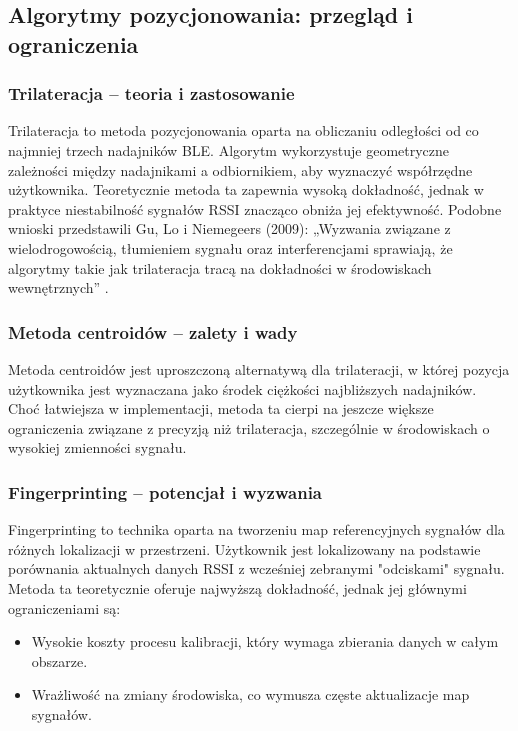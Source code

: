 \subsection{Algorytmy pozycjonowania: przegląd i ograniczenia}

\subsubsection{Trilateracja – teoria i zastosowanie}
Trilateracja to metoda pozycjonowania oparta na obliczaniu odległości od co najmniej trzech nadajników BLE. Algorytm wykorzystuje geometryczne zależności między nadajnikami a odbiornikiem, aby wyznaczyć współrzędne użytkownika. Teoretycznie metoda ta zapewnia wysoką dokładność, jednak w praktyce niestabilność sygnałów RSSI znacząco obniża jej efektywność. Podobne wnioski przedstawili Gu, Lo i Niemegeers (2009): „Wyzwania związane z wielodrogowością, tłumieniem sygnału oraz interferencjami sprawiają, że algorytmy takie jak trilateracja tracą na dokładności w środowiskach wewnętrznych” \cite{Gu2009}.

\subsubsection{Metoda centroidów – zalety i wady}
Metoda centroidów jest uproszczoną alternatywą dla trilateracji, w której pozycja użytkownika jest wyznaczana jako środek ciężkości najbliższych nadajników. Choć łatwiejsza w implementacji, metoda ta cierpi na jeszcze większe ograniczenia związane z precyzją niż trilateracja, szczególnie w środowiskach o wysokiej zmienności sygnału.

\subsubsection{Fingerprinting – potencjał i wyzwania}
Fingerprinting to technika oparta na tworzeniu map referencyjnych sygnałów dla różnych lokalizacji w przestrzeni. Użytkownik jest lokalizowany na podstawie porównania aktualnych danych RSSI z wcześniej zebranymi "odciskami" sygnału. Metoda ta teoretycznie oferuje najwyższą dokładność, jednak jej głównymi ograniczeniami są:
\begin{itemize}
    \item Wysokie koszty procesu kalibracji, który wymaga zbierania danych w całym obszarze.
    \item Wrażliwość na zmiany środowiska, co wymusza częste aktualizacje map sygnałów.
\end{itemize}

